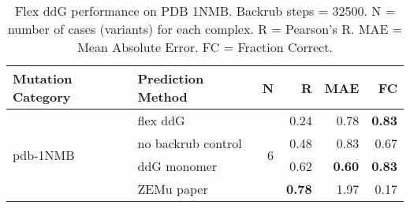 \begin{table}
  \begin{tabular}{llrrrr}
\toprule
Mutation Category &   Prediction Method &  N &    R &  MAE &   FC \\
\midrule
 \multirow{ 4}{*}{pdb-1NMB} & flex ddG & \multirow{ 4}{*}{6} & 0.24 & 0.78 & \textbf{0.83}  \\
 & no backrub control & & 0.48 & 0.83 & 0.67  \\
 & ddG monomer & & 0.62 & \textbf{0.60} & \textbf{0.83}  \\
 & ZEMu paper & & \textbf{0.78} & 1.97 & 0.17  \\
\bottomrule
\end{tabular}
  \caption[Flex ddG performance on PDB 1NMB]{
    Flex ddG performance on PDB 1NMB. Backrub steps = 32500. N = number of cases (variants) for each complex. R = Pearson's R. MAE = Mean Absolute Error. FC = Fraction Correct.
  } \label{tab:table-pdb-1NMB}
\end{table}
